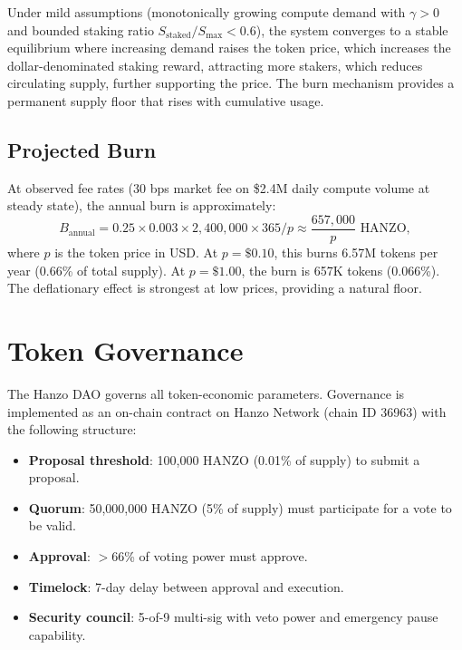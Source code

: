 \documentclass[11pt]{article}
\begin{document}
Under mild assumptions (monotonically growing compute demand with $\gamma > 0$
and bounded staking ratio $S_{\text{staked}}/S_{\max} < 0.6$), the system
converges to a stable equilibrium where increasing demand raises the token price,
which increases the dollar-denominated staking reward, attracting more stakers,
which reduces circulating supply, further supporting the price. The burn
mechanism provides a permanent supply floor that rises with cumulative usage.

\subsection{Projected Burn}

At observed fee rates (30 bps market fee on \$2.4M daily compute volume at
steady state), the annual burn is approximately:
\begin{equation}
B_{\text{annual}} = 0.25 \times 0.003 \times 2{,}400{,}000 \times 365 /
p \approx \frac{657{,}000}{p} \text{ HANZO},
\end{equation}
where $p$ is the token price in USD. At $p = \$0.10$, this burns 6.57M tokens
per year (0.66\% of total supply). At $p = \$1.00$, the burn is 657K tokens
(0.066\%). The deflationary effect is strongest at low prices, providing a
natural floor.

\section{Token Governance}
\label{sec:tokengov}

The Hanzo DAO governs all token-economic parameters. Governance is implemented as
an on-chain contract on Hanzo Network (chain ID 36963) with the following
structure:

\begin{itemize}[leftmargin=1.1em]
    \item \textbf{Proposal threshold}: 100,000 HANZO (0.01\% of supply) to
    submit a proposal.
    \item \textbf{Quorum}: 50,000,000 HANZO (5\% of supply) must participate for
    a vote to be valid.
    \item \textbf{Approval}: $>$66\% of voting power must approve.
    \item \textbf{Timelock}: 7-day delay between approval and execution.
    \item \textbf{Security council}: 5-of-9 multi-sig with veto power and
    emergency pause capability.
\end{itemize}
\end{document}
